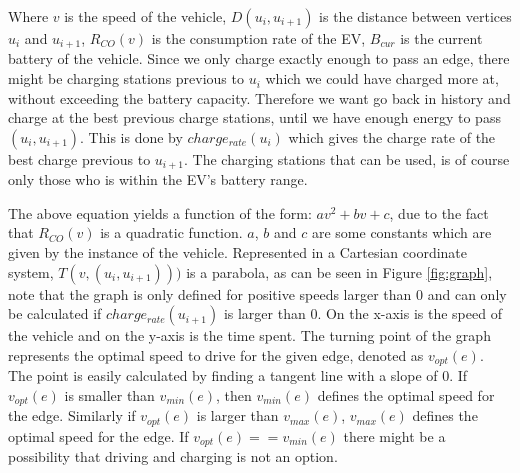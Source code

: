 Where $v$ is the speed of the vehicle, $D(u_i, u_{i+1})$ is the distance between vertices $u_i$ and $u_{i+1}$, $R_{CO}(v)$ is the consumption rate of the EV, $B_{cur}$ is the current battery of the vehicle. Since we only charge exactly enough to pass an edge, there might be charging stations previous to $u_i$ which we could have charged more at, without exceeding the battery capacity. Therefore we want go back in history and charge at the best previous charge stations, until we have enough energy to pass $(u_i, u_{i+1})$. This is done by $charge_{rate}(u_i)$ which gives the charge rate of the best charge previous to $u_{i+1}$. The charging stations that can be used, is of course only those who is within the EV's battery range.

The above equation yields a function of the form: $av^2 + bv + c$, due to the fact that $R_{CO}(v)$ is a quadratic function. $a$, $b$ and $c$ are some constants which are given by the instance of the vehicle. Represented in a Cartesian coordinate system, $T(v,(u_i, u_{i+1})))$ is a parabola, as can be seen in Figure \ref{fig:graph}, note that the graph is only defined for positive speeds larger than $0$ and can only be calculated if $charge_{rate}(u_{i+1})$ is larger than $0$. On the x-axis is the speed of the vehicle and on the y-axis is the time spent. The turning point of the graph represents the optimal speed to drive for the given edge, denoted as $v_{opt}(e)$. The point is easily calculated by finding a tangent line with a slope of $0$. If $v_{opt}(e)$ is smaller than $v_{min}(e)$, then $v_{min}(e)$ defines the optimal speed for the edge. Similarly if $v_{opt}(e)$ is larger than $v_{max}(e)$, $v_{max}(e)$ defines the optimal speed for the edge. If $v_{opt}(e) == v_{min}(e)$ there might be a possibility that driving and charging is not an option. 


